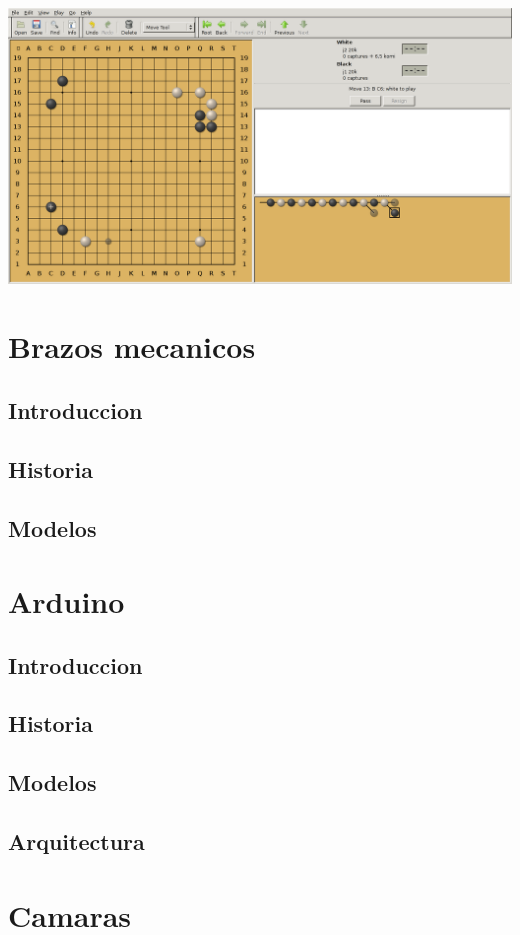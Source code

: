\documentclass[12pt,a4paper]{report}
\begin{document}
\includegraphics[scale=0.33]{quarry.png}


\chapter{Brazos mecanicos}
\section{Introduccion}
\section{Historia}
\section{Modelos}

\chapter{Arduino}
\section{Introduccion}
\section{Historia}
\section{Modelos}
\section{Arquitectura}

\chapter{Camaras}
\end{document}
